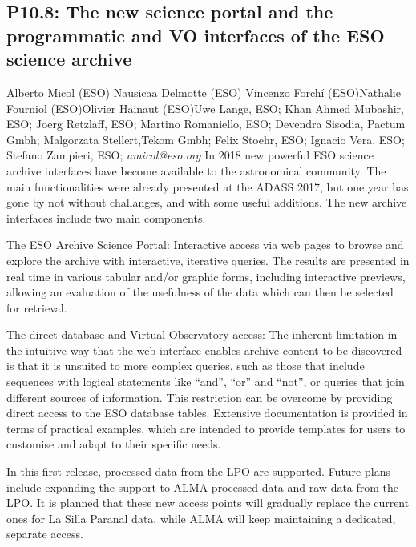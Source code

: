 \documentclass{report}
\begin{document}
\subsection*{P10.8: The new science portal and the programmatic and VO interfaces of the ESO science archive}
\bigskip
Alberto Micol (ESO) \newline Nausicaa Delmotte (ESO) \newline  Vincenzo Forchí (ESO)\newline  Nathalie Fourniol (ESO)\newline Olivier Hainaut (ESO)\newline  Uwe Lange, ESO;
Khan Ahmed Mubashir, ESO;
Joerg Retzlaff, ESO;
Martino Romaniello, ESO;
Devendra Sisodia, Pactum Gmbh;
Malgorzata Stellert,Tekom Gmbh;
Felix Stoehr, ESO;
Ignacio Vera, ESO;
Stefano Zampieri, ESO;\newline\newline
{\it amicol@eso.org}\newline
\newline\newline
In 2018 new powerful ESO science archive interfaces have become available to the astronomical community. The main functionalities were already presented at the ADASS 2017, but one year has gone by not without challanges, and with some useful additions. The new archive interfaces include two main components.

The ESO Archive Science Portal: Interactive access via web pages to browse and explore the archive with interactive, iterative queries. The results are presented in real time in various tabular and/or graphic forms, including interactive previews, allowing an evaluation of the usefulness of the data which can then be selected for retrieval.

The direct database and Virtual Observatory access: The inherent limitation in the intuitive way that the web interface enables archive content to be discovered is that it is unsuited to more complex queries, such as those that include sequences with logical statements like “and”, “or” and “not”, or queries that join different sources of information. This restriction can be overcome by providing direct access to the ESO database tables. Extensive documentation is provided in terms of practical examples, which are intended to provide templates for users to customise and adapt to their specific needs.

In this first release, processed data from the LPO are supported. Future plans include expanding the support to ALMA processed data and raw data from the LPO. It is planned that these new access points will gradually replace the current ones for La Silla Paranal data, while ALMA will keep maintaining a dedicated, separate access.\newline
\newpage
\end{document}

